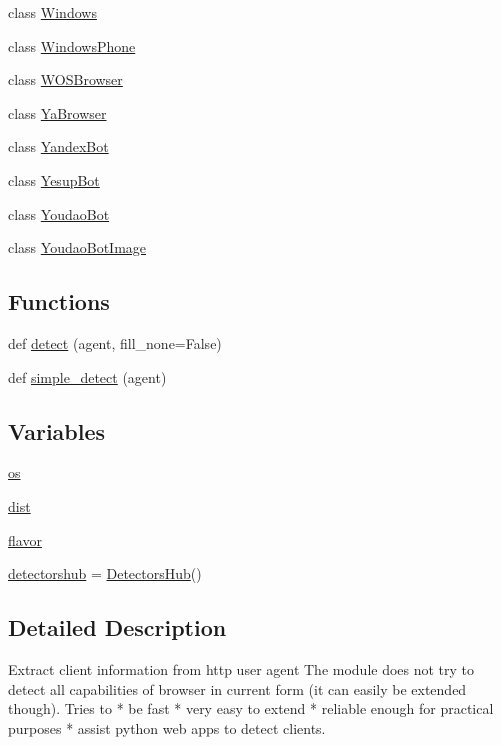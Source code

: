 \begin{DoxyCompactItemize}
\item 
class \hyperlink{classhttpagentparser_1_1_windows}{Windows}
\item 
class \hyperlink{classhttpagentparser_1_1_windows_phone}{Windows\+Phone}
\item 
class \hyperlink{classhttpagentparser_1_1_w_o_s_browser}{W\+O\+S\+Browser}
\item 
class \hyperlink{classhttpagentparser_1_1_ya_browser}{Ya\+Browser}
\item 
class \hyperlink{classhttpagentparser_1_1_yandex_bot}{Yandex\+Bot}
\item 
class \hyperlink{classhttpagentparser_1_1_yesup_bot}{Yesup\+Bot}
\item 
class \hyperlink{classhttpagentparser_1_1_youdao_bot}{Youdao\+Bot}
\item 
class \hyperlink{classhttpagentparser_1_1_youdao_bot_image}{Youdao\+Bot\+Image}
\end{DoxyCompactItemize}
\subsection*{Functions}
\begin{DoxyCompactItemize}
\item 
def \hyperlink{namespacehttpagentparser_a025e116e0d3b48ee4b503c22a5c0b526}{detect} (agent, fill\+\_\+none=False)
\item 
def \hyperlink{namespacehttpagentparser_a0a15d8216f7c48a16305652ede895ee8}{simple\+\_\+detect} (agent)
\end{DoxyCompactItemize}
\subsection*{Variables}
\begin{DoxyCompactItemize}
\item 
\hyperlink{namespacehttpagentparser_a95aaca9fc3022b6e444891570fc9a3f5}{os}
\item 
\hyperlink{namespacehttpagentparser_ae3fc597468692739d473b075ee345c54}{dist}
\item 
\hyperlink{namespacehttpagentparser_a8206c9d0eb055ea2653b65868d5915bb}{flavor}
\item 
\hyperlink{namespacehttpagentparser_ad1f9ce48b19aa304d6918cea335a7723}{detectorshub} = \hyperlink{classhttpagentparser_1_1_detectors_hub}{Detectors\+Hub}()
\end{DoxyCompactItemize}


\subsection{Detailed Description}
\begin{DoxyVerb}Extract client information from http user agent
The module does not try to detect all capabilities of browser in current form (it can easily be extended though).
Tries to
    * be fast
    * very easy to extend
    * reliable enough for practical purposes
    * assist python web apps to detect clients.
\end{DoxyVerb}
 

